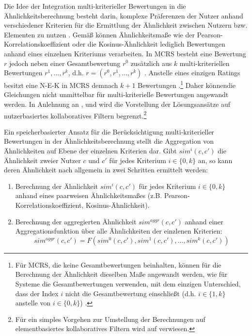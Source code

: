 Die Idee der Integration multi-kriterieller Bewertungen in die Ähnlichkeitsberechnung besteht darin, komplexe Präferenzen der Nutzer anhand verschiedener Kriterien für die Ermittlung der Ähnlichkeit zwischen Nutzern bzw. Elementen zu nutzen \cite[S. 676]{jannach:2:article}. 
Gemäß \textcite[S. 856f.]{adomavicius:4:inbook} können Ähnlichkeitsmaße wie der Pearson-Korrelationskoeffizient oder die Kosinus-Ähnlichkeit lediglich Bewertungen anhand eines einzelnen Kriteriums verarbeiten.
In \ac{MCRS} besteht eine Bewertung $r$ jedoch neben einer Gesamtbewertung $r^{0}$ zusätzlich aus $k$ multi-kriteriellen Bewertungen $r^{1}, ..., r^{k}$, d.h. $r=(r^{0},r^{1}, ..., r^{k})$ \cite[S. 426]{recommenderSystems:2016}\cite[S. 857]{adomavicius:4:inbook}.
Anstelle eines einzigen Ratings besitzt eine \ac{N-E-K} in \ac{MCRS} demnach $k+1$ Bewertungen \cite[S. 857]{adomavicius:4:inbook}.\footnote{Für \ac{MCRS}, die keine Gesamtbewertungen beinhalten, können für die Berechnung der Ähnlichkeit dieselben Maße angewandt werden, wie für Systeme die Gesamtbewertungen verwenden, mit dem einzigen Unterschied, dass der Index $i$ nicht die Gesamtbewertung einschließt (d.h. $i \in \{1,k\}$ anstelle von $i \in \{0,k\}$) \cite[S. 857]{adomavicius:4:inbook}.}
Daher könnendie Gleichungen nicht unmittelbar für multi-kriterielle Bewertungen angewandt werden.
In Anlehnung an \textcite[S. 49]{adomavicius:inproceedings:2}, \textcite[S. 860]{adomavicius:4:inbook} und \textcite[S. 427]{recommenderSystems:2016} wird die Vorstellung der Lösungsansätze auf nutzerbasiertes kollaboratives Filtern begrenzt.\footnote{Für ein simples Vorgehen zur Umstellung der Berechnungen auf elementbasiertes kollaboratives Filtern wird auf \textcite[S. 49]{adomavicius:inproceedings:2} verwiesen.}

Ein speicherbasierter Ansatz für die Berücksichtigung multi-kriterieller Bewertungen in der Ähnlichkeitsberechnung stellt die Aggregation von Ähnlichkeiten auf Ebene der einzelnen Kriterien dar.
Gibt $sim^{i}(c,c')$ die Ähnlichkeit zweier Nutzer $c$ und $c'$ für jedes Kriterium $i \in \{0,k\}$ an, so kann deren Ähnlichkeit nach \textcite[S. 427]{recommenderSystems:2016} allgemein in zwei Schritten ermittelt werden:
\begin{enumerate}
    \item Berechnung der Ähnlichkeit $sim^{i}(c,c')$ für jedes Kriterium $i \in \{0,k\}$ anhand eines paarweisen Ähnlichkeitsmaßes (z.B. Pearson-Korrelations\-koeffizient, Kosinus-Ähnlichkeit).
    \item Berechnung der aggregierten Ähnlichkeit $sim^{aggr}(c,c')$ anhand einer Aggregationsfunktion über alle Ähnlichkeiten der einzlenen Kriterien:
    \begin{equation}
        sim^{aggr}(c,c') = F(sim^{0}(c,c'), sim^{1}(c,c'), ..., sim^{k}(c,c'))
    \end{equation}
\end{enumerate}


